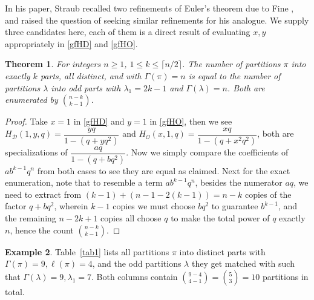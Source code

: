 \documentclass[12pt]{amsart}
\numberwithin{equation}{section}
\theoremstyle{plain}
\newtheorem{theorem}{Theorem}[section]
\theoremstyle{definition}
\newtheorem{example}[theorem]{Example}
\def\D{\mathcal{D}}
\def\O{\mathcal{O}}
\begin{document}
In his paper, Straub recalled two refinements \cite[Example 1.7, 1.8]{Str} of Euler's theorem due to Fine \cite{Fine}, and raised the question of seeking similar refinements for his analogue. We supply three candidates here, each of them is a direct result of evaluating $x,y$ appropriately in \eqref{gfHD} and \eqref{gfHO}.

\begin{theorem}\label{ref1}
For integers $n\geq 1$, $1\leq k \leq \lceil n/2\rceil$. The number of partitions $\pi$ into exactly $k$ parts, all distinct, and with $\Gamma(\pi)=n$ is equal to the number of partitions $\lambda$ into odd parts with $\lambda_1=2k-1$ and $\Gamma(\lambda)=n$. Both are enumerated by $\binom{n-k}{k-1}$.
\end{theorem}
\begin{proof}
Take $x=1$ in \eqref{gfHD} and $y=1$ in \eqref{gfHO}, then we see $H_{\D}(1,y,q)=\dfrac{yq}{1-(q+yq^2)}$ and $H_{\O}(x,1,q)=\dfrac{xq}{1-(q+x^2q^2)}$, both are specializations of $\dfrac{aq}{1-(q+bq^2)}$. Now we simply compare the coefficients of $ab^{k-1}q^n$ from both cases to see they are equal as claimed. Next for the exact enumeration, note that to resemble a term $ab^{k-1}q^n$, besides the numerator $aq$, we need to extract from $(k-1)+(n-1-2(k-1))=n-k$ copies of the factor $q+bq^2$, wherein $k-1$ copies we must choose $bq^2$ to guarantee $b^{k-1}$, and the remaining $n-2k+1$ copies all choose $q$ to make the total power of $q$ exactly $n$, hence the count $\binom{n-k}{k-1}$.
\end{proof}
\begin{example}
Table~\ref{tab1} lists all partitions $\pi$ into distinct parts with $\Gamma(\pi)=9, \ell(\pi)=4$, and the odd partitions $\lambda$ they get matched with such that $\Gamma(\lambda)=9, \lambda_{1}=7$. Both columns contain $\binom{9-4}{4-1}=\binom{5}{3}=10$ partitions in total.
\end{example}
\end{document}
